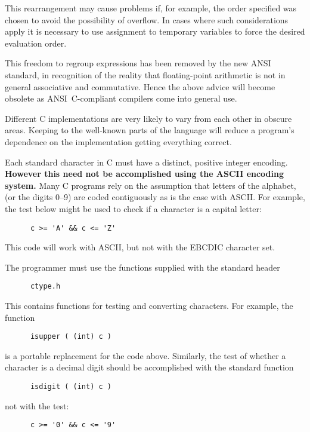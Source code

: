 This rearrangement may cause problems if, for example, the order 
specified was chosen to avoid the possibility of overflow.
In cases where such considerations apply
it is necessary to use assignment to temporary variables to force the 
desired evaluation order.


This freedom to regroup expressions has been removed by the 
new ANSI standard, in 
recognition of the reality that floating-point arithmetic is not in general
associative and commutative. Hence the above advice will become obsolete as 
ANSI~C-compliant compilers come into general use.



Different C implementations are very likely to vary from each other 
in obscure areas.
Keeping to the well-known parts of the language will reduce a 
program's dependence on the implementation getting everything correct.


Each standard character in C must have a distinct, positive integer encoding.
{\bf However this need not be accomplished using the ASCII encoding system.}
Many C programs rely on the assumption that letters of the alphabet,
(or the digits 0--9) are coded contiguously as is the case with ASCII.
For example, the test below might be used to check if a character is 
a capital letter:
\begin{verbatim}
      c >= 'A' && c <= 'Z'
\end{verbatim}
This code will work with ASCII, but not with the EBCDIC character set.

The programmer must use the functions supplied with the standard 
header 
\begin{verbatim}
      ctype.h
\end{verbatim}
This contains functions for testing and converting characters.  For example,
the function 
\begin{verbatim}
      isupper ( (int) c )
\end{verbatim} 
is a portable replacement for the code above.
Similarly, the test of whether a character is a decimal digit 
should be accomplished with the standard function 
\begin{verbatim}
      isdigit ( (int) c )
\end{verbatim}
not with the test: 
\begin{verbatim}
      c >= '0' && c <= '9'
\end{verbatim}

